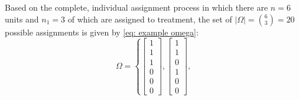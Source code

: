 \documentclass[12pt,leqno]{article}
\theoremstyle{newstyle}
\begin{document}
Based on the complete, individual assignment process in which there are
\(n = 6\) units and \(n_1 = 3\) of which are assigned to treatment, the
set of \(\left\lvert \Omega \right\rvert = \binom{6}{3} = 20\) possible
assignments is given by \cref{eq: example omega}: \begin{equation}
\Omega =
\left\{
\begin{bmatrix} 1 \\ 1 \\ 1 \\ 0 \\ 0 \\ 0 \end{bmatrix},
\begin{bmatrix} 1 \\ 1 \\ 0 \\ 1 \\ 0 \\ 0 \end{bmatrix},

\end{equation}
\end{document}
